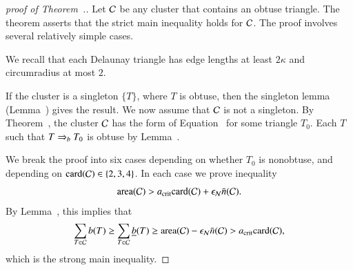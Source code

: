 \begin{proof}[proof of Theorem~.]
  Let $\mathcal C$ be any cluster that contains an obtuse triangle.
  The theorem asserts that the strict main inequality holds for $\mathcal C$.
  The proof involves several relatively simple cases.  

  We recall that each Delaunay triangle has edge lengths at
  least $2\kappa$ and circumradius at most $2$.

  If the cluster is a singleton $\{T\}$, where $T$ is obtuse, then the
  singleton lemma (Lemma~) gives the result.  We
  now assume that $\mathcal C$ is not a singleton.  By
  Theorem~, the cluster $\mathcal C$ has the form of
  Equation~ for some triangle $T_0$.  Each $T$ such
  that $T\Rightarrow_{b} T_0$ is obtuse by Lemma~.

  We break the proof into six cases depending on whether $T_0$ is
  nonobtuse, and depending on ${\operatorname{card}}(\mathcal C)\in \{2,3,4\}$.  In each case
  we prove inequality
\begin{equation}\libel{eqn:n}
 \area(\C) > \acrit \card(\C) + \epsN \tn(\C).
\end{equation}
By Lemma~,    this implies that
\[
\sum_{T\in\mathcal C} b(T) \ge \sum_{T\in\mathcal C} \underline{b}(T) 
\ge {\operatorname{area}}(\mathcal C) -  \epsilon_{\mathcal N}\bar n(\mathcal C) 
> a_\text{crit} {\operatorname{card}}(\mathcal C),
\]
which is the strong main inequality.


\end{proof}
